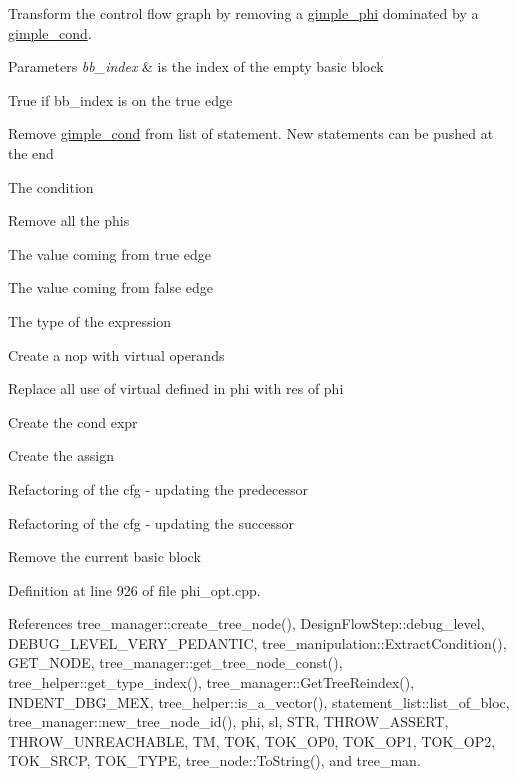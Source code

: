 Transform the control flow graph by removing a \hyperlink{structgimple__phi}{gimple\+\_\+phi} dominated by a \hyperlink{structgimple__cond}{gimple\+\_\+cond}. 


\begin{DoxyParams}{Parameters}
{\em bb\+\_\+index} & is the index of the empty basic block \\
\hline
\end{DoxyParams}
True if bb\+\_\+index is on the true edge

Remove \hyperlink{structgimple__cond}{gimple\+\_\+cond} from list of statement. New statements can be pushed at the end

The condition

Remove all the phis

The value coming from true edge

The value coming from false edge

The type of the expression

Create a nop with virtual operands

Replace all use of virtual defined in phi with res of phi

Create the cond expr

Create the assign

Refactoring of the cfg -\/ updating the predecessor

Refactoring of the cfg -\/ updating the successor

Remove the current basic block 

Definition at line 926 of file phi\+\_\+opt.\+cpp.



References tree\+\_\+manager\+::create\+\_\+tree\+\_\+node(), Design\+Flow\+Step\+::debug\+\_\+level, D\+E\+B\+U\+G\+\_\+\+L\+E\+V\+E\+L\+\_\+\+V\+E\+R\+Y\+\_\+\+P\+E\+D\+A\+N\+T\+IC, tree\+\_\+manipulation\+::\+Extract\+Condition(), G\+E\+T\+\_\+\+N\+O\+DE, tree\+\_\+manager\+::get\+\_\+tree\+\_\+node\+\_\+const(), tree\+\_\+helper\+::get\+\_\+type\+\_\+index(), tree\+\_\+manager\+::\+Get\+Tree\+Reindex(), I\+N\+D\+E\+N\+T\+\_\+\+D\+B\+G\+\_\+\+M\+EX, tree\+\_\+helper\+::is\+\_\+a\+\_\+vector(), statement\+\_\+list\+::list\+\_\+of\+\_\+bloc, tree\+\_\+manager\+::new\+\_\+tree\+\_\+node\+\_\+id(), phi, sl, S\+TR, T\+H\+R\+O\+W\+\_\+\+A\+S\+S\+E\+RT, T\+H\+R\+O\+W\+\_\+\+U\+N\+R\+E\+A\+C\+H\+A\+B\+LE, TM, T\+OK, T\+O\+K\+\_\+\+O\+P0, T\+O\+K\+\_\+\+O\+P1, T\+O\+K\+\_\+\+O\+P2, T\+O\+K\+\_\+\+S\+R\+CP, T\+O\+K\+\_\+\+T\+Y\+PE, tree\+\_\+node\+::\+To\+String(), and tree\+\_\+man.



